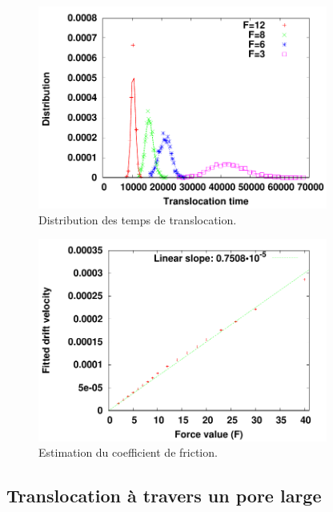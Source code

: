 \documentclass[a4paper,11pt]{article}
\begin{document}
\begin{figure}[H]
\begin{center}
\includegraphics[width=0.85\textwidth]{distribpolsimple.pdf}


\caption{Distribution des temps de translocation. }
\label{distribpolsimple}
\end{center}
\end{figure}


\begin{figure}[H]
\begin{center}
\includegraphics[width=0.85\textwidth]{translofrictioncoeffsimplepol.pdf}


\caption{Estimation du coefficient de friction. }
\label{frictionpolsimple}
\end{center}
\end{figure}




 

 


\subsection{Translocation à travers un pore large}
\end{document}
